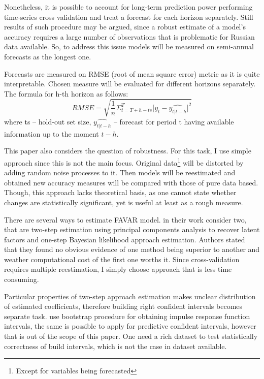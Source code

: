 \documentclass[a4paper, 14pt]{article}
\begin{document}
Nonetheless, it is possible to account for long-term prediction power performing time-series cross validation and treat a forecast for each horizon separately. Still results of such procedure may be argued, since a robust estimate of a model's accuracy requires a large number of observations that is problematic for Russian data available. So, to address this issue models will be measured on semi-annual forecasts as the longest one. 

Forecasts are measured on RMSE (root of mean square error) metric
as it is quite interpretable. Chosen measure will be evaluated for different horizons separately. The formula for h-th horizon as follows:
\[
	RMSE = 
	\sqrt{
		\frac{1}{n}
		\Sigma_{t= T + h - ts}^{T}
			\Big[
			y_t - \widehat{y_{t|t-h}}
			\Big]^2}
\] where ts -- hold-out set size, $\widehat{y_{t|t-h}}$ -- forecast for period t having available information up to the moment $t-h$.

This paper also considers the question of robustness. For this task, I use simple approach since this is not the main focus. Original data\footnote{Except for variables being forecasted} will be distorted by adding random noise processes to it. Then models will be reestimated and obtained new accuracy measures will be compared with those of pure data based. Though, this approach lacks theoretical basis, as one cannot state whether changes are statistically significant, yet is useful at least as a rough measure.

There are several ways to estimate FAVAR model. \cite{bernanke2005measuring} in their work consider two, that are two-step estimation using principal components analysis to recover latent factors and one-step Bayesian likelihood approach estimation. Authors stated that they found no obvious evidence of one method being superior to another and weather computational cost of the first one worths it. Since cross-validation requires multiple reestimation, I simply choose approach that is less time consuming. 

Particular properties of two-step approach estimation makes unclear distribution of estimated coefficients, therefore building right confident intervals becomes separate task. \cite{bernanke2005measuring} use bootstrap procedure for obtaining impulse response function intervals, the same is possible to apply for predictive confident intervals, however that is out of the scope of this paper. One need a rich dataset to test statistically correctness of build intervals, which is not the case in dataset available.
\end{document}
